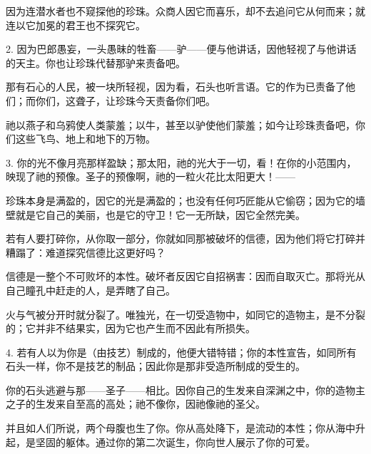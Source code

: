 因为连潜水者也不窥探他的珍珠。众商人因它而喜乐，却不去追问它从何而来；就连以它加冕的君王也不探究它。\par

2. 因为巴郎愚妄，一头愚昧的牲畜——驴——便与他讲话，因他轻视了与他讲话的天主。你也让珍珠代替那驴来责备吧。\par

那有石心的人民，被一块所轻视，因为看，石头也听言语。它的作为已责备了他们；而你们，这聋子，让珍珠今天责备你们吧。\par

祂以燕子和乌鸦使人类蒙羞；以牛，甚至以驴使他们蒙羞；如今让珍珠责备吧，你们这些飞鸟、地上和地下的万物。\par

3. 你的光不像月亮那样盈缺；那太阳，祂的光大于一切，看！在你的小范围内，映现了祂的预像。圣子的预像啊，祂的一粒火花比太阳更大！——\par

珍珠本身是满盈的，因它的光是满盈的；也没有任何巧匠能从它偷窃；因为它的墙壁就是它自己的美丽，也是它的守卫！它一无所缺，因它全然完美。\par

若有人要打碎你，从你取一部分，你就如同那被破坏的信德，因为他们将它打碎并糟蹋了：难道探究信德比这更好吗？\par

信德是一整个不可败坏的本性。破坏者反因它自招祸害：因而自取灭亡。那将光从自己瞳孔中赶走的人，是弄瞎了自己。\par

火与气被分开时就分裂了。唯独光，在一切受造物中，如同它的造物主，是不分裂的；它并非不结果实，因为它也产生而不因此有所损失。\par

4. 若有人以为你是（由技艺）制成的，他便大错特错；你的本性宣告，如同所有石头一样，你不是技艺的制品；因此你是那非受造所制成的受生的。\par

你的石头逃避与那——圣子——相比。因你自己的生发来自深渊之中，你的造物主之子的生发来自至高的高处；祂不像你，因祂像祂的圣父。\par

并且如人们所说，两个母腹也生了你。你从高处降下，是流动的本性；你从海中升起，是坚固的躯体。通过你的第二次诞生，你向世人展示了你的可爱。\par

